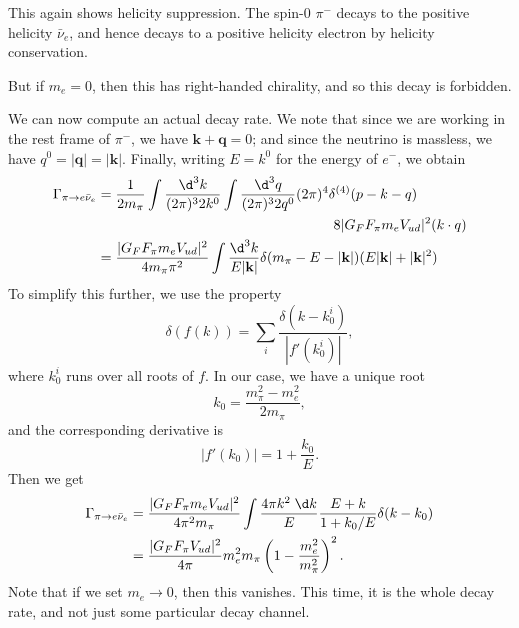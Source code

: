 \documentclass[a4paper]{article}
\begin{document}
This again shows helicity suppression. The spin-$0$ $\pi^-$ decays to the positive helicity $\bar{\nu}_e$, and hence decays to a positive helicity electron by helicity conservation.
\begin{center}
\end{center}
But if $m_e = 0$, then this has right-handed chirality, and so this decay is forbidden.

We can now compute an actual decay rate. We note that since we are working in the rest frame of $\pi^-$, we have $\mathbf{k} + \mathbf{q} = 0$; and since the neutrino is massless, we have $q^0 = |\mathbf{q}| = |\mathbf{k}|$. Finally, writing $E = k^0$ for the energy of $e^-$, we obtain
\begin{align*}
  \Gamma_{\pi \to e \bar{\nu}_e} &= \frac{1}{2 m_\pi} \int \frac{\d^3 k}{(2\pi)^3 2 k^0} \int \frac{\d^3 q}{(2\pi)^3 2 q^0} (2\pi)^4 \delta^{(4)}(p - k - q) \\
  &\hphantom{aaaaaaaaaaaaaaaaaaaaaaaaaaaaaaaa} 8 |G_F F_\pi m_e V_{ud}|^2 (k \cdot q)\\
  &= \frac{|G_F F_\pi m_e V_{ud}|^2 }{4 m_\pi \pi^2} \int \frac{\d^3 k}{E|\mathbf{k}|} \delta(m_{\pi} - E - |\mathbf{k}|) (E |\mathbf{k}| + |\mathbf{k}|^2)
\end{align*}
To simplify this further, we use the property
\[
  \delta(f(k)) = \sum_i \frac{\delta(k - k_0^i)}{|f'(k_0^i)|},
\]
where $k_0^i$ runs over all roots of $f$. In our case, we have a unique root
\[
  k_0 =\frac{m_\pi^2 - m_e^2}{2m_\pi},
\]
and the corresponding derivative is
\[
  |f'(k_0)| = 1 + \frac{k_0}{E}.
\]
Then we get
\begin{align*}
  \Gamma_{\pi \to e \bar{\nu}_e} &= \frac{|G_F F_\pi m_e V_{ud}|^2}{4 \pi^2 m_\pi}\int \frac{4\pi k^2 \;\d k}{E} \frac{E + k}{1 + k_0/E} \delta(k - k_0)\\
  &= \frac{|G_F F_\pi V_{ud}|^2}{4\pi} m_e^2 m_\pi \left(1 - \frac{m_e^2}{m_\pi^2}\right)^2.
\end{align*}
Note that if we set $m_e \to 0$, then this vanishes. This time, it is the whole decay rate, and not just some particular decay channel.
\end{document}
